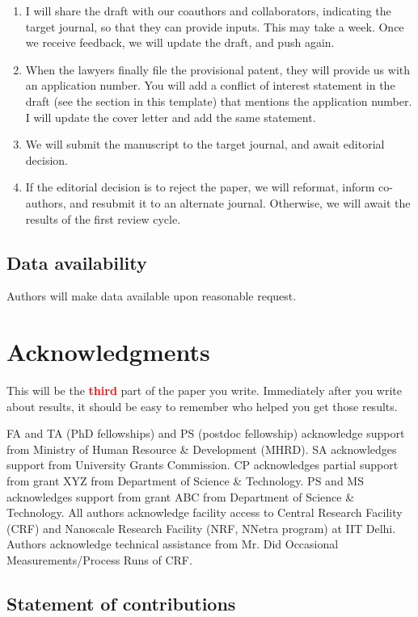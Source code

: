 \documentclass[12 pt]{article}
\begin{document}
\begin{enumerate}
\item I will share the draft with our coauthors and collaborators, indicating the target journal, so that they can provide inputs. This may take a week. Once we receive feedback, we will update the draft, and push again.
\item When the lawyers finally file the provisional patent, they will provide us with an application number. You will add a conflict of interest statement in the draft (see the section in this template) that mentions the application number. I will update the cover letter and add the same statement.
\item We will submit the manuscript to the target journal, and await editorial decision.
\item If the editorial decision is to reject the paper, we will reformat, inform co-authors, and resubmit it to an alternate journal. Otherwise, we will await the results of the first review cycle.
\end{enumerate}

\subsection*{Data availability}

Authors will make data available upon reasonable request.

\section*{Acknowledgments}

This will be the \textbf{\Huge \textcolor{red}{third}} part of the paper you write. Immediately after you write about results, it should be easy to remember who helped you get those results.

FA and TA (PhD fellowships) and PS (postdoc fellowship) acknowledge support from Ministry of Human Resource \& Development (MHRD). SA acknowledges support from University Grants Commission. CP acknowledges partial support from grant XYZ from Department of Science \& Technology. PS and MS acknowledges support from grant ABC from Department of Science \& Technology. All authors acknowledge facility access to Central Research Facility (CRF) and Nanoscale Research Facility (NRF, NNetra program) at IIT Delhi. Authors acknowledge technical assistance from Mr. Did Occasional Measurements/Process Runs of CRF.

\subsection*{Statement of contributions}
\end{document}
